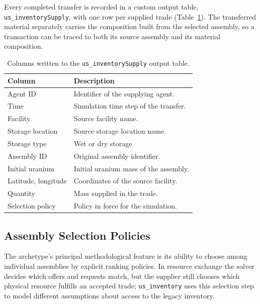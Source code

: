 Every completed transfer is recorded in a custom \Cyclus output table,
\texttt{us\_inventorySupply}, with one row per supplied trade
(Table~\ref{tab:usinv-supply}). The transferred material separately carries the
composition built from the selected assembly, so a transaction can be traced to both
its source assembly and its material composition.

\begin{table}[h!]
    \centering
    \caption{Columns written to the \texttt{us\_inventorySupply} output table.}
    \label{tab:usinv-supply}
    \begin{tabular}{p{} p{}}
        \hline
        \textbf{Column} & \textbf{Description} \\
        \hline
        Agent ID          & Identifier of the supplying agent. \\
        Time              & Simulation time step of the transfer. \\
        Facility          & Source facility name. \\
        Storage location  & Source storage location name. \\
        Storage type      & Wet or dry storage. \\
        Assembly ID       & Original assembly identifier. \\
        Initial uranium   & Initial uranium mass of the assembly. \\
        Latitude, longitude & Coordinates of the source facility. \\
        Quantity          & Mass supplied in the trade. \\
        Selection policy  & Policy in force for the simulation. \\
        \hline
    \end{tabular}
\end{table}

\subsection{Assembly Selection Policies}
\label{subsec:us-inventory-policies}

The archetype's principal methodological feature is its ability to choose among
individual assemblies by explicit ranking policies. In resource exchange the
solver decides which offers and requests match, but the supplier still chooses
which physical resource fulfills an accepted trade; \texttt{us\_inventory} uses
this selection step to model different assumptions about access to the legacy
inventory.

